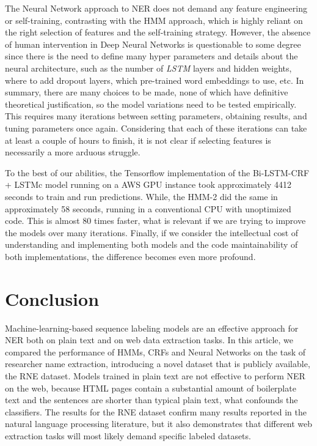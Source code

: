 \documentclass{nle}
\begin{document}
The Neural Network approach to NER does not demand any feature engineering or self-training, 
contrasting with the HMM approach, which is highly reliant on
the right selection of features and the self-training strategy. However, the absence of
human intervention in Deep Neural Networks is questionable to some degree since there is the
need to define many hyper parameters and
details about the neural architecture, such as the number of \textit{LSTM} layers and
hidden weights, where to add dropout layers, which pre-trained word embeddings to use, etc. In summary, 
there are many choices to be made, none of which have definitive theoretical justification, 
so the model variations need to be tested empirically. This requires many iterations between setting
parameters, obtaining results, and tuning parameters once again. Considering that each of 
these iterations can take at least a couple of hours to finish, it is not clear if
selecting features is necessarily a more arduous struggle.

To the best of our abilities, the Tensorflow implementation of the Bi-LSTM-CRF + LSTMc
model running on a AWS GPU instance took approximately 4412 seconds to train 
and run predictions. While, the HMM-2 did the same in approximately
58 seconds, running in a conventional CPU with unoptimized code. This is almost 80 times 
faster, what is relevant if we are trying to improve the models over many iterations.
Finally, if we consider the intellectual cost of understanding and implementing both 
models and the code maintainability of both implementations, the difference becomes even 
more profound.


\section{Conclusion}

Machine-learning-based sequence labeling models are an effective approach for NER 
both on plain text and on web data extraction tasks. 
In this article, we compared the performance of HMMs, CRFs and Neural Networks on the task of
researcher name extraction, introducing a novel dataset that is publicly available,
the RNE dataset.
Models trained in plain text are not effective to perform NER on the web, because 
HTML pages contain a substantial amount of boilerplate text and the sentences are shorter 
than typical plain text, what confounds the classifiers. The results for the RNE dataset
confirm many results reported in the natural language processing literature, but it also 
demonstrates that different web extraction tasks will most likely demand specific labeled 
datasets. 
\end{document}
